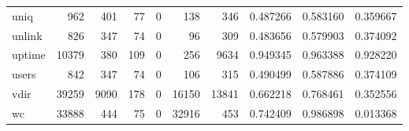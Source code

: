 \begin{longtable}{lrrrrrrrrr}
uniq      &                                 962 &                                             401 &                                             77 &                                             0 &                                            138 &                                          346 &                                           0.487266 &                               0.583160 &                             0.359667 \\
unlink    &                                 826 &                                             347 &                                             74 &                                             0 &                                             96 &                                          309 &                                           0.483656 &                               0.579903 &                             0.374092 \\
uptime    &                               10379 &                                             380 &                                            109 &                                             0 &                                            256 &                                         9634 &                                           0.949345 &                               0.963388 &                             0.928220 \\
users     &                                 842 &                                             347 &                                             74 &                                             0 &                                            106 &                                          315 &                                           0.490499 &                               0.587886 &                             0.374109 \\
vdir      &                               39259 &                                            9090 &                                            178 &                                             0 &                                          16150 &                                        13841 &                                           0.662218 &                               0.768461 &                             0.352556 \\
wc        &                               33888 &                                             444 &                                             75 &                                             0 &                                          32916 &                                          453 &                                           0.742409 &                               0.986898 &                             0.013368 \\

\end{longtable}
